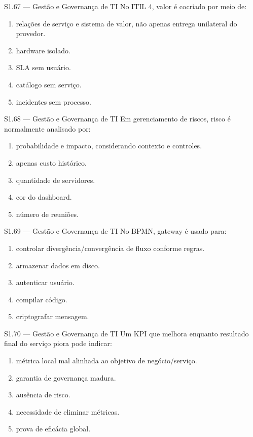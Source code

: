 \begin{questao}{S1.67 — Gestão e Governança de TI}
No ITIL 4, valor é cocriado por meio de:
\begin{enumerate}[label=\Alph*)]\item relações de serviço e sistema de valor, não apenas entrega unilateral do provedor.\item hardware isolado.\item SLA sem usuário.\item catálogo sem serviço.\item incidentes sem processo.\end{enumerate}
\end{questao}

\begin{questao}{S1.68 — Gestão e Governança de TI}
Em gerenciamento de riscos, risco é normalmente analisado por:
\begin{enumerate}[label=\Alph*)]\item probabilidade e impacto, considerando contexto e controles.\item apenas custo histórico.\item quantidade de servidores.\item cor do dashboard.\item número de reuniões.\end{enumerate}
\end{questao}

\begin{questao}{S1.69 — Gestão e Governança de TI}
No BPMN, gateway é usado para:
\begin{enumerate}[label=\Alph*)]\item controlar divergência/convergência de fluxo conforme regras.\item armazenar dados em disco.\item autenticar usuário.\item compilar código.\item criptografar mensagem.\end{enumerate}
\end{questao}

\begin{questao}{S1.70 — Gestão e Governança de TI}
Um KPI que melhora enquanto resultado final do serviço piora pode indicar:
\begin{enumerate}[label=\Alph*)]\item métrica local mal alinhada ao objetivo de negócio/serviço.\item garantia de governança madura.\item ausência de risco.\item necessidade de eliminar métricas.\item prova de eficácia global.\end{enumerate}
\end{questao}


